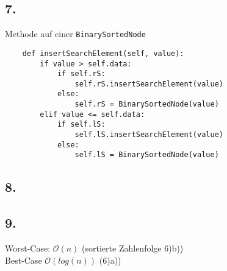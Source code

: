 \documentclass{article}
\begin{document}
\subsection*{7.}
Methode auf einer \verb"BinarySortedNode"
\begin{verbatim}
    def insertSearchElement(self, value):
        if value > self.data:
            if self.rS:
                self.rS.insertSearchElement(value)
            else:
                self.rS = BinarySortedNode(value)
        elif value <= self.data:
            if self.lS:
                self.lS.insertSearchElement(value)
            else:
                self.lS = BinarySortedNode(value)
\end{verbatim}
\subsection*{8.}

\subsection*{9.}
Worst-Case: $\mathcal O(n)$ (sortierte Zahlenfolge 6)b))\\
Best-Case $\mathcal O(log(n))$ (6)a)) 
\end{document}
